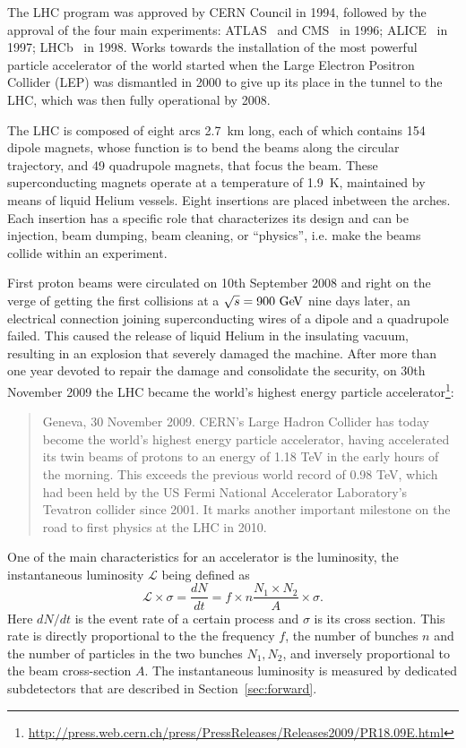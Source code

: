 
The LHC program was approved by CERN Council in 1994, followed by the approval of
the four main experiments: ATLAS~\cite{Aad:2008zzm} and CMS~\cite{cms}
in 1996; ALICE~\cite{alice} in 1997; LHCb~\cite{lhcb} in 1998.
Works towards the installation of the most powerful particle accelerator of the world
started when the Large Electron Positron Collider (LEP) was dismantled in 2000 to 
give up its place in the tunnel to the LHC, which was then fully operational by 2008.

The LHC is composed of eight arcs 2.7~km long, each of which contains 154 dipole 
magnets, whose function is to  bend the beams along the circular trajectory, and
49 quadrupole magnets, that focus the beam. These superconducting magnets operate
at a temperature of 1.9~K, maintained by means of liquid Helium vessels.
Eight insertions are placed inbetween the arches. Each insertion has a specific
role that characterizes its design and can be injection, beam dumping, beam cleaning,
or ``physics'', i.e. make the beams collide within an experiment.

First proton beams were circulated on 10th September 2008 and right on the verge of
getting the first collisions at a \cme $\rts=900\gev$ nine days later, an electrical
connection joining superconducting wires of a dipole and a quadrupole
failed. This caused the release of liquid Helium in the insulating vacuum,
resulting in an explosion that severely damaged the machine.
After more than one year devoted to repair the damage and consolidate the security,
on 30th November 2009 the LHC became the world's highest energy particle 
accelerator\footnote{\url{http://press.web.cern.ch/press/PressReleases/Releases2009/PR18.09E.html}}:
\begin{quotation}\small
Geneva, 30 November 2009. CERN's Large Hadron Collider has today become the world’s highest energy particle accelerator, having accelerated its twin beams of protons to an energy of 1.18 TeV in the early hours of the morning. This exceeds the previous world record of 0.98 TeV, which had been held by the US Fermi National Accelerator Laboratory’s Tevatron collider since 2001. It marks another important milestone on the road to first physics at the LHC in 2010.
\end{quotation}


One of the main characteristics for an accelerator is the luminosity, the 
instantaneous luminosity $\mathcal L$ being defined as 
\begin{equation}\label{eq:lumiN}
\mathcal{L}\times\sigma=\dfrac{dN}{dt}=f\times n\dfrac{N_1\times N_2}{A}\times\sigma.
\end{equation} 
Here $dN/dt $ is the event rate of a certain process and $\sigma$ is its cross 
section. This rate is directly proportional to the the frequency $f$, the number 
of bunches $n$ and the number of particles in the two bunches $N_1, N_2$, and
inversely proportional to the beam cross-section $A$.
The instantaneous luminosity is measured by dedicated subdetectors that are
described in Section~\ref{sec:forward}.

